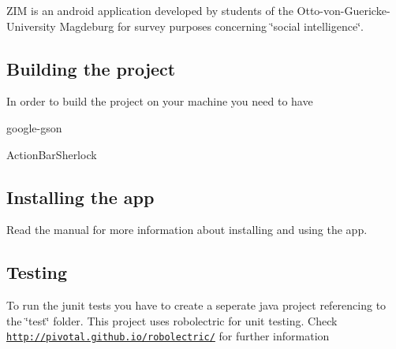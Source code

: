 Z\-I\-M is an android application developed by students of the Otto-\/von-\/\-Guericke-\/\-University Magdeburg for survey purposes concerning \char`\"{}social intelligence\char`\"{}.

\subsection*{Building the project }

In order to build the project on your machine you need to have
\begin{DoxyItemize}
\item google-\/gson
\item Action\-Bar\-Sherlock
\end{DoxyItemize}

\subsection*{Installing the app }

Read the manual for more information about installing and using the app.

\subsection*{Testing }

To run the junit tests you have to create a seperate java project referencing to the \char`\"{}test\char`\"{} folder. This project uses robolectric for unit testing. Check \href{http://pivotal.github.io/robolectric/}{\tt http\-://pivotal.\-github.\-io/robolectric/} for further information 